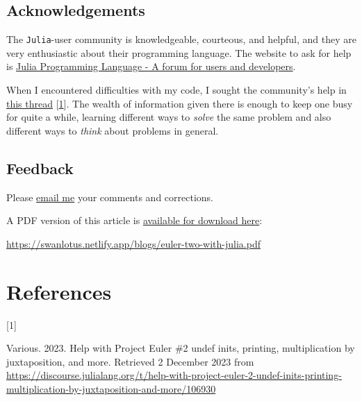 \documentclass[
  a4paper,
]{article}
\newlength{\cslhangindent}
\newlength{\csllabelwidth}
\newlength{\cslentryspacingunit} %
\newenvironment{CSLReferences}[2] %
 {%
  \setlength{\parindent}{0pt}
  \ifodd #1
  \let\oldpar\par
  \def\par{\hangindent=\cslhangindent\oldpar}
  \fi
  \setlength{\parskip}{#2\cslentryspacingunit}
 }%
 {}
\newcommand{\CSLLeftMargin}[1]{\parbox[t]{\csllabelwidth}{#1}}
\newcommand{\CSLRightInline}[1]{\parbox[t]{\linewidth - \csllabelwidth}{#1}\break}
\begin{document}
\hypertarget{acknowledgements}{%
\subsection{Acknowledgements}\label{acknowledgements}}

The \texttt{Julia}-user community is knowledgeable, courteous, and
helpful, and they are very enthusiastic about their programming
language. The website to ask for help is
\href{https://discourse.julialang.org/}{Julia Programming Language - A
forum for users and developers}.

When I encountered difficulties with my code, I sought the community's
help in
\href{https://discourse.julialang.org/t/help-with-project-euler-2-undef-inits-printing-multiplication-by-juxtaposition-and-more/106930}{this
thread} {[}\protect\hyperlink{ref-julia-help}{1}{]}. The wealth of
information given there is enough to keep one busy for quite a while,
learning different ways to \emph{solve} the same problem and also
different ways to \emph{think} about problems in general.

\hypertarget{feedback}{%
\subsection{Feedback}\label{feedback}}

Please \href{mailto:feedback.swanlotus@gmail.com}{email me} your
comments and corrections.

\noindent A PDF version of this article is
\href{auxiliary/euler-two-with-julia.pdf}{available for download here}:

\begin{small}

\begin{sffamily}

\url{https://swanlotus.netlify.app/blogs/euler-two-with-julia.pdf}

\end{sffamily}

\end{small}

\hypertarget{bibliography}{%
\section*{References}\label{bibliography}}

\hypertarget{refs}{}
\begin{CSLReferences}{0}{0}
\leavevmode{}%
\CSLLeftMargin{{[}1{]} }%
\CSLRightInline{Various. 2023. {Help with Project Euler \#2\: undef
inits, printing, multiplication by juxtaposition, and more}. Retrieved 2
December 2023 from
\url{https://discourse.julialang.org/t/help-with-project-euler-2-undef-inits-printing-multiplication-by-juxtaposition-and-more/106930}}

\end{CSLReferences}
\end{document}
